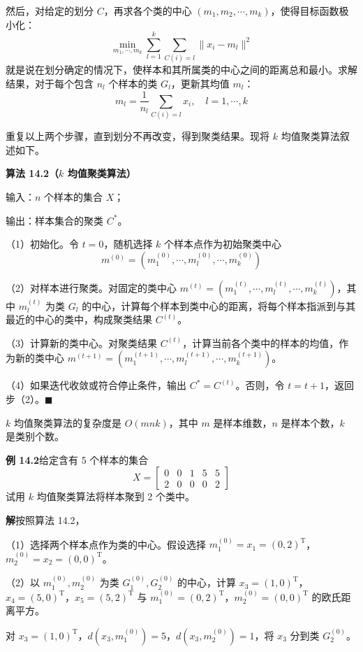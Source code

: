 \documentclass[UTF8,12pt,a4paper,fontset=fandol]{ctexart}
\begin{document}
然后，对给定的划分 $C$，再求各个类的中心 $(m_1,m_2,\cdots,m_k)$，使得目标函数极小化：
\[
\min_{m_1,\cdots,m_k}\sum_{l=1}^k\sum_{C(i)=l}\|x_i-m_l\|^2
\]
就是说在划分确定的情况下，使样本和其所属类的中心之间的距离总和最小。求解结果，对于每个包含 $n_l$ 个样本的类 $G_l$，更新其均值 $m_l$：
\[
m_l=\frac{1}{n_l}\sum_{C(i)=l}x_i,\quad l=1,\cdots,k
\]

重复以上两个步骤，直到划分不再改变，得到聚类结果。现将 $k$ 均值聚类算法叙述如下。

\noindent\textbf{算法 14.2（$k$ 均值聚类算法）}

输入：$n$ 个样本的集合 $X$；

输出：样本集合的聚类 $C^*$。

（1）初始化。令 $t=0$，随机选择 $k$ 个样本点作为初始聚类中心
\[
m^{(0)}=(m_1^{(0)},\cdots,m_l^{(0)},\cdots,m_k^{(0)})
\]

（2）对样本进行聚类。对固定的类中心 $m^{(t)}=(m_1^{(t)},\cdots,m_l^{(t)},\cdots,m_k^{(t)})$，其中 $m_l^{(t)}$ 为类 $G_l$ 的中心，计算每个样本到类中心的距离，将每个样本指派到与其最近的中心的类中，构成聚类结果 $C^{(t)}$。

（3）计算新的类中心。对聚类结果 $C^{(t)}$，计算当前各个类中的样本的均值，作为新的类中心 $m^{(t+1)}=(m_1^{(t+1)},\cdots,m_l^{(t+1)},\cdots,m_k^{(t+1)})$。

（4）如果迭代收敛或符合停止条件，输出 $C^*=C^{(t)}$。否则，令 $t=t+1$，返回步（2）。\hfill$\blacksquare$

$k$ 均值聚类算法的复杂度是 $O(mnk)$，其中 $m$ 是样本维数，$n$ 是样本个数，$k$ 是类别个数。

\noindent\textbf{例 14.2}\quad 给定含有 5 个样本的集合
\[
X=
\begin{bmatrix}
0 & 0 & 1 & 5 & 5\\
2 & 0 & 0 & 0 & 2
\end{bmatrix}
\]
试用 $k$ 均值聚类算法将样本聚到 2 个类中。

\noindent\textbf{解}\quad 按照算法 14.2，

（1）选择两个样本点作为类的中心。假设选择 $m_1^{(0)}=x_1=(0,2)^{\mathrm{T}}$，$m_2^{(0)}=x_2=(0,0)^{\mathrm{T}}$。

（2）以 $m_1^{(0)},m_2^{(0)}$ 为类 $G_1^{(0)},G_2^{(0)}$ 的中心，计算 $x_3=(1,0)^{\mathrm{T}}$，$x_4=(5,0)^{\mathrm{T}}$，$x_5=(5,2)^{\mathrm{T}}$ 与 $m_1^{(0)}=(0,2)^{\mathrm{T}}$，$m_2^{(0)}=(0,0)^{\mathrm{T}}$ 的欧氏距离平方。

对 $x_3=(1,0)^{\mathrm{T}}$，$d(x_3,m_1^{(0)})=5$，$d(x_3,m_2^{(0)})=1$，将 $x_3$ 分到类 $G_2^{(0)}$。
\end{document}
